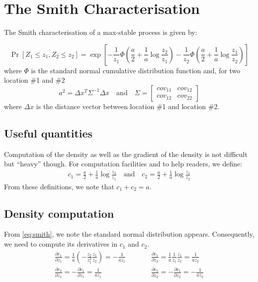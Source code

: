 \documentclass{article}
\begin{document}
\section{The Smith Characterisation}
\label{sec:smith-char}

The Smith characterisation of a max-stable process is given by:

\begin{equation}
  \label{eq:smith}
  \Pr[Z_1 \leq z_1, Z_2 \leq z_2] = \exp\left[-\frac{1}{z_1} \Phi
    \left(\frac{a}{2} + \frac{1}{a} \log \frac{z_2}{z_1} \right) -
    \frac{1}{z_2} \Phi \left(\frac{a}{2} + \frac{1}{a}
      \log\frac{z_1}{z_2} \right) \right]
\end{equation}
where $\Phi$ is the standard normal cumulative distribution function
and, for two location \#1 and \#2  
\begin{equation*}
  a^2 = \Delta x^T \Sigma^{-1} \Delta x \quad \text{and} \quad 
  \Sigma = 
  \begin{bmatrix}
    cov_{11} & cov_{12}\\
    cov_{12} & cov_{22}
  \end{bmatrix}
\end{equation*}
where $\Delta x$ is the distance vector between location \#1 and
location \#2.

\subsection{Useful quantities}
\label{sec:usefull-quantities}

Computation of the density as well as the gradient of the density is
not difficult but ``heavy'' though. For computation facilities and to
help readers, we define:
\begin{eqnarray}
  \label{eq:1}
  c_1 = \frac{a}{2} + \frac{1}{a} \log \frac{z_2}{z_1} \quad
  \text{and} \quad
  c_2 = \frac{a}{2} + \frac{1}{a} \log \frac{z_1}{z_2}
\end{eqnarray}
From these definitions, we note that $c_1 + c_2 = a$.

\subsection{Density computation}
\label{sec:density-computation}

From \eqref{eq:smith}, we note the standard normal distribution
appears. Consequently, we need to compute its derivatives in $c_1$ and
$c_2$.
\begin{eqnarray}
  \label{eq:2}
  \frac{\partial c_1}{\partial z_1} = \frac{1}{a} \left(-
    \frac{z_2}{z_1^2} \frac{z_1}{z_2} \right) = -\frac{1}{az_1} &\qquad&
  \frac{\partial c_1}{\partial z_2} = \frac{1}{a} \frac{1}{z_1}
  \frac{z_1}{z_2} = \frac{1}{az_2}\\
  \frac{\partial c_2}{\partial z_1} = - \frac{\partial c_1}{\partial z_1}
  = \frac{1}{az_1} &\qquad&
  \frac{\partial c_2}{\partial z_2} = - \frac{\partial c_1}{\partial z_2}
  = - \frac{1}{az_2}  
\end{eqnarray}
\end{document}
